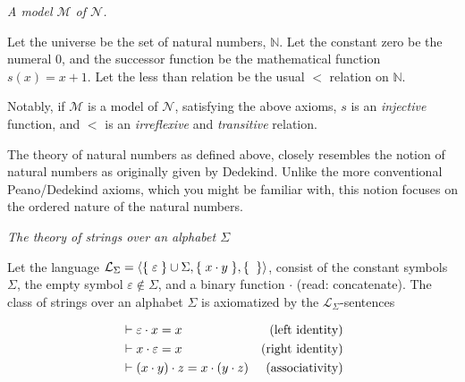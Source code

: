 \begin{example} \textit{A model $\mathcal{M}$ of $\mathcal{N}$.}

Let the universe be the set of natural numbers, $\mathbb{N}$. Let the constant
zero be the numeral $0$, and the successor function be the mathematical
function $s(x)=x+1$. Let the less than relation be the usual $<$ relation on
$\mathbb{N}$.

Notably, if $\mathcal{M}$ is a model of $\mathcal{N}$, satisfying the above
axioms, $s$ is an \emph{injective} function, and $<$ is an \emph{irreflexive}
and \emph{transitive} relation.

\end{example}

\begin{remark}

The theory of natural numbers as defined above, closely resembles the notion of
natural numbers as originally given by Dedekind\cite{beman-1901,joyce-2005}.
Unlike the more conventional Peano/Dedekind axioms, which you might be familiar
with, this notion focuses on the ordered nature of the natural numbers.

\end{remark}

\begin{definition} \emph{The theory of strings over an alphabet $\Sigma$}

Let the language
$\mathcal{L}_\Sigma=\mathopen{}\left\langle{\ensuremath{\mathopen{}\left\{\mathrel{}{\varepsilon}\mathrel{}\right\}\mathclose{}}\cup\Sigma,\ensuremath{\mathopen{}\left\{\mathrel{}{x\cdot y}\mathrel{}\right\}\mathclose{}},\ensuremath{\mathopen{}\left\{\mathrel{}{}\mathrel{}\right\}\mathclose{}}}\right\rangle\mathclose{}$,
consist of the constant symbols $\Sigma$, the empty symbol $\varepsilon \notin
\Sigma$, and a binary function $\cdot$ (read: concatenate). The class of
strings over an alphabet $\Sigma$ is axiomatized by the
$\mathcal{L}_\Sigma$-sentences

\begin{align}
&\vdash \varepsilon \cdot x = x & \text{(left identity)} \\
&\vdash x \cdot \varepsilon = x & \text{(right identity)} \\
&\vdash \mathopen{}\left({ x \cdot y }\right)\mathclose{} \cdot z = x \cdot \mathopen{}\left({ y \cdot z }\right)\mathclose{} & \text{(associativity)}
\end{align}

\end{definition}



